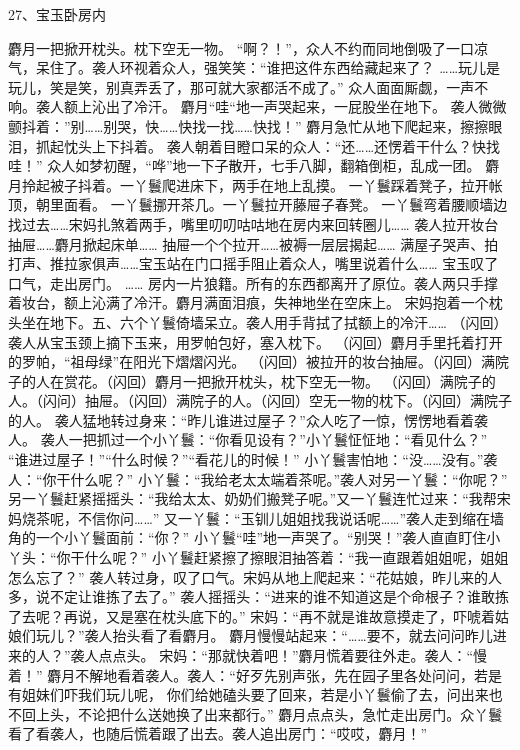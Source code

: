 27、宝玉卧房内\par
麝月一把掀开枕头。枕下空无一物。
“啊？！”，众人不约而同地倒吸了一口凉气，呆住了。袭人环视着众人，强笑笑：“谁把这件东西给藏起来了？
……玩儿是玩儿，笑是笑，别真弄丢了，那可就大家都活不成了。”
众人面面厮觑，一声不响。袭人额上沁出了冷汗。
麝月“哇“地一声哭起来，一屁股坐在地下。
袭人微微颤抖着：”别……别哭，快……快找一找……快找！”
麝月急忙从地下爬起来，擦擦眼泪，抓起忱头上下抖着。
袭人朝着目瞪口呆的众人：“还……还愣着干什么？快找哇！”
众人如梦初醒，“哗”地一下子散开，七手八脚，翻箱倒柜，乱成一团。
麝月拎起被子抖着。一丫鬟爬进床下，两手在地上乱摸。
一丫鬟踩着凳子，拉开帐顶，朝里面看。
一丫鬟挪开茶几。一丫鬟拉开藤屉子春凳。
一丫鬟弯着腰顺墙边找过去……宋妈扎煞着两手，嘴里叨叨咕咕地在房内来回转圈儿……
袭人拉开妆台抽屉……麝月掀起床单……
抽屉一个个拉开……被褥一层层揭起……
满屋子哭声、拍打声、推拉家俱声……宝玉站在门口摇手阻止着众人，嘴里说着什么……
宝玉叹了口气，走出房门。
……
房内一片狼籍。所有的东西都离开了原位。袭人两只手撑着妆台，额上沁满了冷汗。麝月满面泪痕，失神地坐在空床上。
宋妈抱着一个枕头坐在地下。五、六个丫鬟倚墙呆立。袭人用手背拭了拭额上的冷汗……
（闪回）袭人从宝玉颈上摘下玉来，用罗帕包好，塞入枕下。
（闪回）麝月手里托着打开的罗帕，“祖母绿”在阳光下熠熠闪光。
（闪回）被拉开的妆台抽屉。（闪回）满院子的人在赏花。（闪回）麝月一把掀开枕头，枕下空无一物。
（闪回）满院子的人。（闪问）抽屉。（闪回）满院子的人。（闪回）空无一物的枕下。（闪回）满院子的人。
袭人猛地转过身来：“昨儿谁进过屋子？”众人吃了一惊，愣愣地看着袭人。
袭人一把抓过一个小丫鬟：“你看见设有？”小丫鬟怔怔地：“看见什么？”
“谁进过屋子！”“什么时候？”“看花儿的时候！”
小丫鬟害怕地：“没……没有。”袭人：“你干什么呢？”
小丫鬟：“我给老太太端着茶呢。”袭人对另一丫鬟：“你呢？”
另一丫鬟赶紧摇摇头：“我给太太、奶奶们搬凳子呢。”又一丫鬟连忙过来：“我帮宋妈烧茶呢，不信你问……”
又一丫鬟：“玉钏儿姐姐找我说话呢……”袭人走到缩在墙角的一个小丫鬟面前：“你？”
小丫鬟“哇”地一声哭了。“别哭！”袭人直直盯住小丫头：“你干什么呢？”
小丫鬟赶紧擦了擦眼泪抽答着：“我一直跟着姐姐呢，姐姐怎么忘了？”
袭人转过身，叹了口气。宋妈从地上爬起来：“花姑娘，昨儿来的人多，说不定让谁拣了去了。”
袭人摇摇头：“进来的谁不知道这是个命根子？谁敢拣了去呢？再说，又是塞在枕头底下的。”
宋妈：“再不就是谁故意摸走了，吓唬着姑娘们玩儿？”袭人抬头看了看麝月。
麝月慢慢站起来：“……要不，就去问问昨儿进来的人？”袭人点点头。
宋妈：“那就快着吧！”麝月慌着要往外走。袭人：“慢着！”
麝月不解地看着袭人。袭人：“好歹先别声张，先在园子里各处问问，若是有姐妹们吓我们玩儿呢，
你们给她磕头要了回来，若是小丫鬟偷了去，问出来也不回上头，不论把什么送她换了出来都行。”
麝月点点头，急忙走出房门。众丫鬟看了看袭人，也随后慌着跟了出去。袭人追出房门：“哎哎，麝月！”

